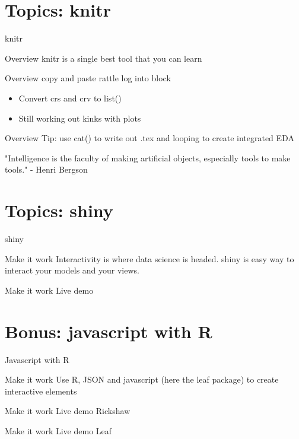\documentclass[xcolor=dvipsnames]{beamer}
\begin{document}
\section{Topics: knitr}
\begin{frame}[t,allowframebreaks]{knitr}
\begin{block}{Overview }
knitr is a single best tool that you can learn
\end{block}
\begin{block}{Overview }
copy and paste rattle log into block
\end{block}

\begin{itemize}
\item Convert crs and crv to list()
\item Still working out kinks with plots
\end{itemize}
\begin{block}{Overview }
Tip: use cat() to write out .tex and looping to create integrated EDA
\end{block}
"Intelligence is the faculty of making artificial objects, especially tools to make tools." - Henri Bergson
\end{frame}


\section{Topics: shiny}
\begin{frame}[t,allowframebreaks]{shiny}
\begin{block}{Make it work}
Interactivity is where data science is headed. shiny is easy way to interact your models and your views. 
\end{block}

\begin{block}{Make it work}
Live demo 
\end{block}

\end{frame}

\section{Bonus: javascript with R}
\begin{frame}[t,allowframebreaks]{Javascript with R}

\begin{block}{Make it work}
Use R, JSON and javascript (here the leaf package) to create interactive elements
\end{block}

\begin{block}{Make it work}
Live demo Rickshaw
\end{block}

\begin{block}{Make it work}
Live demo Leaf
\end{block}

\end{frame}


 
\end{document}
